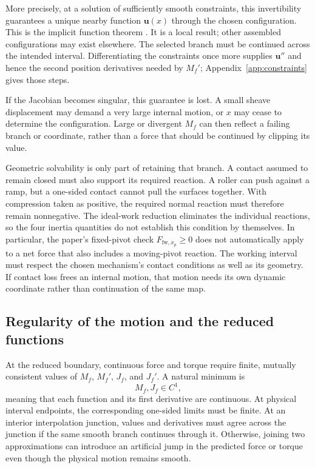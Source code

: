 \documentclass[11pt,letterpaper]{article}
\numberwithin{equation}{section}
\begin{document}
More precisely, at a solution of sufficiently smooth constraints, this invertibility guarantees a unique nearby function $\bm u(x)$ through the chosen configuration. This is the implicit function theorem \cite{implicit}. It is a local result; other assembled configurations may exist elsewhere. The selected branch must be continued across the intended interval. Differentiating the constraints once more supplies $\bm u''$ and hence the second position derivatives needed by $M_f'$; Appendix~\ref{app:constraints} gives those steps.

If the Jacobian becomes singular, this guarantee is lost. A small sheave displacement may demand a very large internal motion, or $x$ may cease to determine the configuration. Large or divergent $M_f$ can then reflect a failing branch or coordinate, rather than a force that should be continued by clipping its value.

Geometric solvability is only part of retaining that branch. A contact assumed to remain closed must also support its required reaction. A roller can push against a ramp, but a one-sided contact cannot pull the surfaces together. With compression taken as positive, the required normal reaction must therefore remain nonnegative. The ideal-work reduction eliminates the individual reactions, so the four inertia quantities do not establish this condition by themselves. In particular, the paper's fixed-pivot check $F_{\mathrm{fw},x_p}\ge0$ does not automatically apply to a net force that also includes a moving-pivot reaction. The working interval must respect the chosen mechanism's contact conditions as well as its geometry. If contact loss frees an internal motion, that motion needs its own dynamic coordinate rather than continuation of the same map.

\subsection{Regularity of the motion and the reduced functions}

At the reduced boundary, continuous force and torque require finite, mutually consistent values of $M_f$, $M_f'$, $J_f$, and $J_f'$. A natural minimum is
\begin{equation}
  M_f,J_f\in C^1,
  \label{eq:C1}
\end{equation}
meaning that each function and its first derivative are continuous. At physical interval endpoints, the corresponding one-sided limits must be finite. At an interior interpolation junction, values and derivatives must agree across the junction if the same smooth branch continues through it. Otherwise, joining two approximations can introduce an artificial jump in the predicted force or torque even though the physical motion remains smooth.
\end{document}
